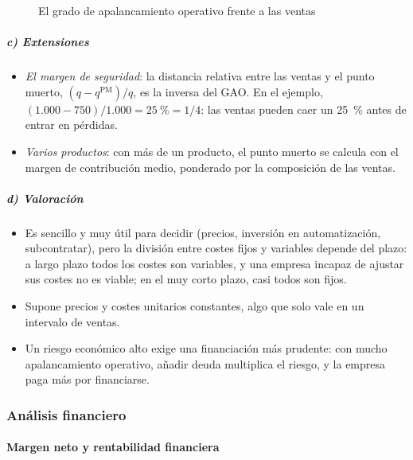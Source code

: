 \documentclass[11pt]{article}
\begin{document}
\begin{figure}[H]
\centering
\caption{El grado de apalancamiento operativo frente a las ventas}\label{fig:gao}
\end{figure}

\subparagraph{c) Extensiones}

\begin{itemize}
\item \emph{El margen de seguridad}: la distancia relativa entre las ventas y el punto muerto, $(q-q^{\mathrm{PM}})/q$, es la inversa del GAO. En el ejemplo, $(1.000-750)/1.000=25~\%=1/4$: las ventas pueden caer un 25~\% antes de entrar en pérdidas.
\item \emph{Varios productos}: con más de un producto, el punto muerto se calcula con el margen de contribución medio, ponderado por la composición de las ventas.
\end{itemize}

\subparagraph{d) Valoración}

\begin{itemize}
\item Es sencillo y muy útil para decidir (precios, inversión en automatización, subcontratar), pero la división entre costes fijos y variables depende del plazo: a largo plazo todos los costes son variables, y una empresa incapaz de ajustar sus costes no es viable; en el muy corto plazo, casi todos son fijos.
\item Supone precios y costes unitarios constantes, algo que solo vale en un intervalo de ventas.
\item Un riesgo económico alto exige una financiación más prudente: con mucho apalancamiento operativo, añadir deuda multiplica el riesgo, y la empresa paga más por financiarse.
\end{itemize}

\subsubsection{Análisis financiero}\label{sec:analisis-financiero}

\paragraph{Margen neto y rentabilidad financiera}
\end{document}
